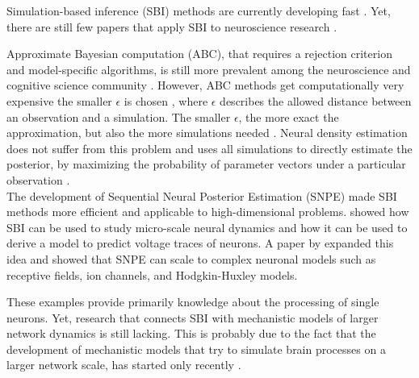 \documentclass[12pt]{extreport}
\begin{document}
Simulation-based inference (SBI) methods are currently developing fast \citep{cranmer2020frontier}. Yet, there are still few papers that apply SBI to neuroscience research \citep{lueckmann2021benchmarking, jallais2021cytoarchitecture, goncalves2018flexible, schroder2019approximate}.

Approximate Bayesian computation (ABC), that requires a rejection criterion and model-specific algorithms, is still more prevalent among the neuroscience and cognitive science community \citep{west2021inference, kangasraasio2017inferring}. However, ABC methods get computationally very expensive the smaller $\epsilon$ is chosen \citep{papamakarios2016fast}, where $\epsilon$ describes the allowed distance between an observation and a simulation. The smaller $\epsilon$, the more exact the approximation, but also the more simulations needed \citep{papamakarios2016fast}. 
Neural density estimation does not suffer from this problem and uses all simulations to directly estimate the posterior, by maximizing the probability of parameter vectors under a particular observation \citep{papamakarios2016fast}. \\

The development of Sequential Neural Posterior Estimation (SNPE) \citep{greenberg_automatic_2019, lueckmann2017flexible, papamakarios2016fast} made SBI methods more efficient and applicable to high-dimensional problems. \cite{lueckmann2017flexible} showed how SBI can be used to study micro-scale neural dynamics and how it can be used to derive a model to predict voltage traces of neurons. A paper by \cite{gonccalves2020training} expanded this idea and showed that SNPE can scale to complex neuronal models such as receptive fields, ion channels, and Hodgkin-Huxley models. 

These examples provide primarily knowledge about the processing of single neurons. Yet, research that connects SBI with mechanistic models of larger network dynamics is still lacking. This is probably due to the fact that the development of mechanistic models that try to simulate brain processes on a larger network scale, has started only recently \citep{schurmann2007blue, markram2011introducing}.\\

\end{document}
